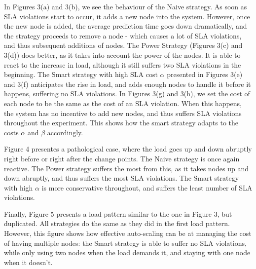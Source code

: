 \documentclass[12pt]{article}
\begin{document}
In Figures 3(a) and 3(b), we see the behaviour of the Naive strategy. As soon as
SLA violations start to occur, it adds a new node into the system. However, once
the new node is added, the average prediction time goes down dramatically, and
the strategy proceeds to remove a node - which causes a lot of SLA violations,
and thus subsequent additions of nodes. The Power Strategy (Figures 3(c) and
3(d)) does better, as it takes into account the power of the nodes. It is able
to react to the increase in load, although it still suffers two SLA violations
in the beginning. The Smart strategy with high SLA cost $\alpha$ presented in
Figures 3(e) and 3(f) anticipates the
rise in load, and adds enough nodes to handle it before it happens, suffering no
SLA violations. In Figures 3(g) and 3(h), we set the cost of each node to be the
same as the cost of an SLA violation. When this happens, the system has no
incentive to add new nodes, and thus suffers SLA violations throughout the
experiment. This shows how the smart strategy adapts to the costs $\alpha$ and
$\beta$ accordingly.

Figure 4 presentes a pathological case, where the load goes up and down abruptly
right before or right after the change points. The Naive strategy is once again
reactive. The Power strategy suffers the most from this, as it takes nodes up
and down abruptly, and thus suffers the most SLA violations. The Smart strategy
with high $\alpha$ is more conservative throughout, and suffers the least number
of SLA violations.

Finally, Figure 5 presents a load pattern similar to the one in Figure 3, but
duplicated. All strategies do the same as they did in the first load pattern.
However, this figure shows how effective auto-scaling can be at managing the
cost of having multiple nodes: the Smart strategy is able to suffer no SLA
violations, while only using two nodes when the load demands it, and staying
with one node when it doesn't.
\end{document}
